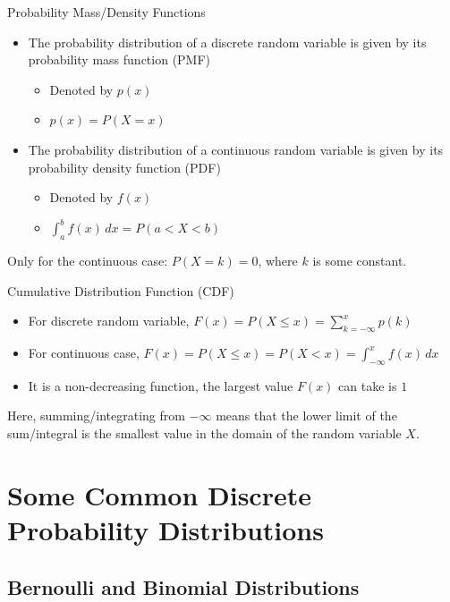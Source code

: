 \documentclass[12pt, aspectratio=169]{beamer}
\begin{document}
	\begin{frame}{Probability Mass/Density Functions}
		\begin{itemize}
			\item The probability distribution of a discrete random variable is given by its probability mass function (PMF)
			\begin{itemize}
				\item Denoted by \(p(x)\)
				\item \(p(x) = P(X = x)\)
			\end{itemize}
			\item The probability distribution of a continuous random variable is given by its probability density function (PDF)
				\begin{itemize}
					\item Denoted by \(f(x)\)
					\item \(\displaystyle \int_a^b f(x) \, dx = P(a < X < b)\)
				\end{itemize}
		\end{itemize}
		Only for the continuous case: \(P(X = k) = 0\), where \(k\) is some constant.
	\end{frame}


	\begin{frame}{Cumulative Distribution Function (CDF)}
				\begin{itemize}
			\item For discrete random variable, \(
				F(x) = P(X \leqslant x) = \displaystyle \sum_{k=-\infty}^{x} p(k)
			\)
			\item For continuous case, \(
				F(x) = P(X \leqslant x) = P(X<x) = \displaystyle \int_{-\infty}^{x} f(x) \, dx
			\)
			\item It is a non-decreasing function, the largest value \(F(x)\) can take is \(1\)
		\end{itemize}

		\vspace{0.5em}

		Here, summing/integrating from $-\infty$ means that the lower limit of the sum/integral is the smallest value in the domain of the random variable $X$.
	\end{frame}


	\section{Some Common Discrete Probability Distributions}

	\subsection{Bernoulli and Binomial Distributions}
\end{document}
